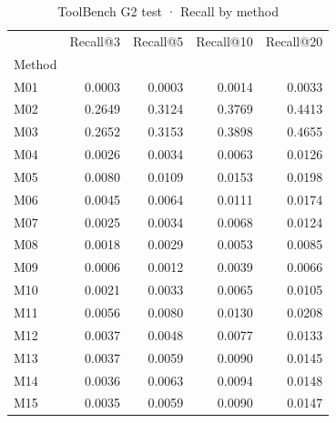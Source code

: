 \begin{table}
\caption{ToolBench G2 test · Recall by method}
\label{tab:ToolBench-G2-test-comparison-comparison-recall}
\begin{tabular}{lrrrr}
\toprule
 & Recall@3 & Recall@5 & Recall@10 & Recall@20 \\
Method &  &  &  &  \\
\midrule
M01 & 0.0003 & 0.0003 & 0.0014 & 0.0033 \\
M02 & 0.2649 & 0.3124 & 0.3769 & 0.4413 \\
M03 & 0.2652 & 0.3153 & 0.3898 & 0.4655 \\
M04 & 0.0026 & 0.0034 & 0.0063 & 0.0126 \\
M05 & 0.0080 & 0.0109 & 0.0153 & 0.0198 \\
M06 & 0.0045 & 0.0064 & 0.0111 & 0.0174 \\
M07 & 0.0025 & 0.0034 & 0.0068 & 0.0124 \\
M08 & 0.0018 & 0.0029 & 0.0053 & 0.0085 \\
M09 & 0.0006 & 0.0012 & 0.0039 & 0.0066 \\
M10 & 0.0021 & 0.0033 & 0.0065 & 0.0105 \\
M11 & 0.0056 & 0.0080 & 0.0130 & 0.0208 \\
M12 & 0.0037 & 0.0048 & 0.0077 & 0.0133 \\
M13 & 0.0037 & 0.0059 & 0.0090 & 0.0145 \\
M14 & 0.0036 & 0.0063 & 0.0094 & 0.0148 \\
M15 & 0.0035 & 0.0059 & 0.0090 & 0.0147 \\
\bottomrule
\end{tabular}
\end{table}

